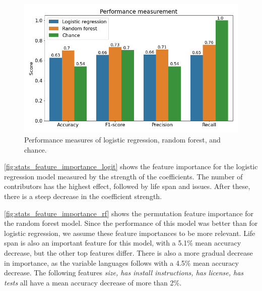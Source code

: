 \begin{figure}[h!]
\centerline{
\includegraphics[scale=0.5]{figures_results/stats_barplot_scores.png}}
\caption{Performance measures of logistic regression, random forest, and chance.
\label{fig:stats_barplot_scores}}
\end{figure}

\newpage
\autoref{fig:stats_feature_importance_logit} shows the feature importance for the logistic regression model measured by the strength of the coefficients. The number of contributors has the highest effect, followed by life span and issues. After these, there is a steep decrease in the coefficient strength. 

\autoref{fig:stats_feature_importance_rf} shows the permutation feature importance for the random forest model. Since the performance of this model was better than for logistic regression, we assume these feature importances to be more relevant. Life span is also an important feature for this model, with a 5.1\% mean accuracy decrease, but the other top features differ. There is also a more gradual decrease in importance, as the variable languages follows with a 4.5\% mean accuracy decrease. The following features \textit{size, has install instructions, has license, has tests} all have a mean accuracy decrease of more than 2\%. 




